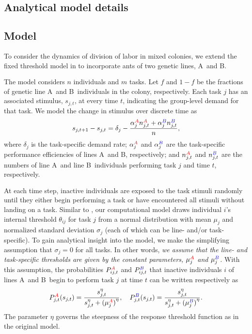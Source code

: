 \documentclass[11pt]{article}
\newcommand{\A}{{\color{red}A}}
\newcommand{\B}{{\color{blue}B}}
\begin{document}
\newpage
\begin{appendices}
\section{Analytical model details} \label{sec:appendix}

\subsection{Model} \label{sec:model}

To consider the dynamics of division of labor in mixed colonies, we extend the fixed threshold model in \cite{ulrich18} to incorporate ants of two genetic lines, \A\ and \B. 

The model considers $n$ individuals and $m$ tasks. 
Let $f$ and $1-f$ be the fractions of genetic line \A\ and \B\ individuals in the colony, respectively.
Each task $j$ has an associated stimulus, $s_{j,t}$, at every time $t$, indicating the group-level demand for that task. We model the change in stimulus over discrete time as
\begin{equation}
    s_{j,t+1} - s_{j,t}  = \delta_j - \frac{\alpha_j^{\A} n_{j,t}^{\A} + \alpha_j^{\B} n_{j,t}^{\B} }{n}, \label{eq:stim}
\end{equation}
where $\delta_j$ is the task-specific demand rate; $\alpha_j^{\A}$ and $\alpha_j^{\B}$ are the task-specific performance efficiencies of lines \A\ and \B, respectively; and $n_{j,t}^{\A}$ and $n_{j,t}^{\B}$ are the numbers of line \A\ and line \B\ individuals performing task $j$ and time $t$, respectively.

At each time step, inactive individuals are exposed to the task stimuli randomly until they  either begin performing a task or have encountered all stimuli without landing on a task. Similar to \cite{ulrich18}, our computational model draws individual $i$'s internal threshold $\theta_{ij}$ for task $j$ from a normal distribution with mean $\mu_j$ and normalized standard deviation $\sigma_j$ (each of which can be line- and/or task-specific). To gain analytical insight into the model, we make the simplifying assumption that $\sigma_j = 0$ for all tasks.
In other words, \textit{we assume that the line- and task-specific thresholds are given by the constant parameters, $\mu_j^{\A}$ and $\mu_j^{\B}$.}
With this assumption, the probabilities $P_{ij,t}^{\A}$ and $P_{ij,t}^{\B}$ that inactive individuals $i$ of lines \A\ and \B\ begin to perform task $j$ at time $t$ can be written respectively as
\begin{equation}
    P_{j,t}^{\A} (s_{j,t}) = \frac{s_{j,t}^\eta}{s_{j,t}^\eta + {(\mu_j^{\A})}^\eta}, \quad P_{j,t}^{\B} (s_{j,t}) = \frac{s_{j,t}^\eta}{s_{j,t}^\eta +{(\mu_j^{\B})}^\eta}.
\end{equation}
The parameter $\eta$ governs the steepness of the response threshold function as in the original model.


\end{appendices}
\end{document}
